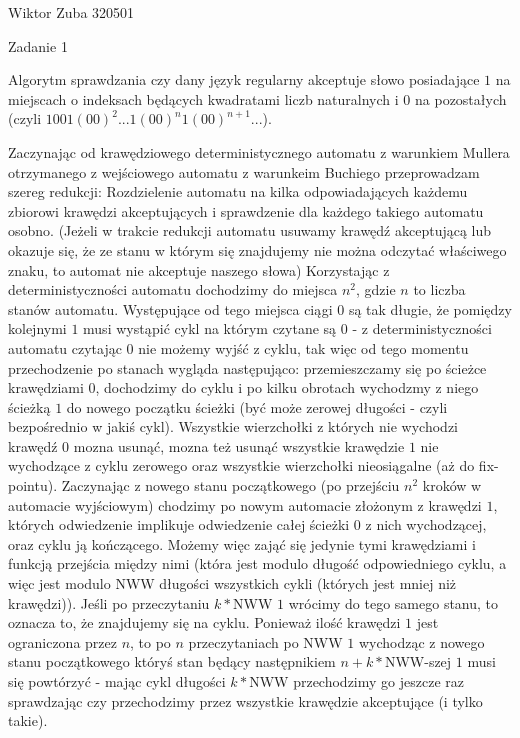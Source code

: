 \documentclass{article}
\begin{document}
Wiktor Zuba 320501\newline

Zadanie 1\newline

Algorytm sprawdzania czy dany język regularny akceptuje słowo posiadające $1$ na miejscach o indeksach będących kwadratami liczb naturalnych
i $0$ na pozostałych (czyli $1001(00)^2...1(00)^n1(00)^{n+1}...$).\newline

Zaczynając od krawędziowego deterministycznego automatu z warunkiem Mullera otrzymanego z wejściowego automatu z warunkeim Buchiego przeprowadzam szereg redukcji:\newline
Rozdzielenie automatu na kilka odpowiadających każdemu zbiorowi krawędzi akceptujących i sprawdzenie dla każdego takiego automatu osobno.\newline
(Jeżeli w trakcie redukcji automatu usuwamy krawędź akceptującą lub okazuje się, że ze stanu w którym się znajdujemy nie można odczytać właściwego znaku,
to automat nie akceptuje naszego słowa)\newline
Korzystając z deterministyczności automatu dochodzimy do miejsca $n^2$, gdzie $n$ to liczba stanów automatu. Występujące od tego miejsca ciągi $0$ są tak długie,
że pomiędzy kolejnymi $1$ musi wystąpić cykl na którym czytane są $0$ - z deterministyczności automatu czytając $0$ nie możemy wyjść z cyklu,
tak więc od tego momentu przechodzenie po stanach wygląda następująco: przemieszczamy się po ścieżce krawędziami $0$, dochodzimy do cyklu i po kilku obrotach
wychodzmy z niego ścieżką $1$ do nowego początku ścieżki (być może zerowej długości - czyli bezpośrednio w jakiś cykl).
Wszystkie wierzchołki z których nie wychodzi krawędź $0$ mozna usunąć, mozna też usunąć wszystkie krawędzie $1$ nie wychodzące z cyklu zerowego oraz
wszystkie wierzchołki nieosiągalne (aż do fix-pointu).\newline
Zaczynając z nowego stanu początkowego (po przejściu $n^2$ kroków w automacie wyjściowym) chodzimy po nowym automacie złożonym z krawędzi $1$,
których odwiedzenie implikuje odwiedzenie całej ścieżki $0$ z nich wychodzącej, oraz cyklu ją kończącego. Możemy więc zająć się jedynie tymi krawędziami
i funkcją przejścia między nimi (która jest modulo długość odpowiedniego cyklu, a więc jest modulo NWW długości wszystkich cykli
(których jest mniej niż krawędzi)). Jeśli po przeczytaniu $k*$NWW $1$ wrócimy do tego samego stanu, to oznacza to, że znajdujemy się na cyklu.
Ponieważ ilość krawędzi $1$ jest ograniczona przez $n$, to po $n$ przeczytaniach po NWW $1$ wychodząc z nowego stanu początkowego
któryś stan będący następnikiem $n+k*$NWW-szej $1$ musi się powtórzyć - mając cykl długości $k*$NWW przechodzimy go jeszcze raz sprawdzając czy przechodzimy przez wszystkie krawędzie akceptujące
(i tylko takie).\newline\newline
\end{document}
